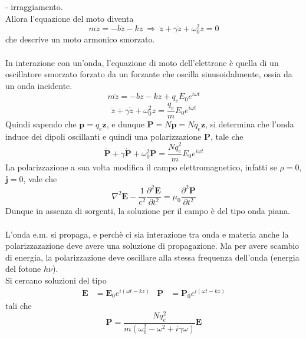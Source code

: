 \documentclass{article}
\begin{document}
- irraggiamento.\\
Allora l'equazione del moto diventa
\begin{equation}
    m\ddot{z}=-b\dot{z}-kz \ \Rightarrow \ \ddot{z}+\gamma\dot{z}+\omega_0^2z=0
\nonumber
\end{equation}
che descrive un moto armonico smorzato.\\
\\
In interazione con un’onda, l’equazione di moto dell’elettrone è quella di un oscillatore smorzato forzato da un forzante che oscilla sinusoidalmente, ossia da un onda incidente.
\begin{equation}
    m\ddot{z}=-b\dot{z}-kz+q_eE_0e^{i\omega t}
\nonumber
\end{equation}
\begin{equation}
    \ddot{z}+\gamma\dot{z}+\omega_0^2z=\frac{q_e}{m} E_0e^{i\omega t}
\nonumber
\end{equation}
Quindi sapendo che $\textbf{p}=q_e\textbf{z}$, e dunque $\textbf{P}=N\textbf{p}=Nq_e\textbf{z}$, si determina che l’onda induce dei dipoli oscillanti e quindi una polarizzazione \textbf{P}, tale che
\begin{equation}
    \ddot{\textbf{P}}+\gamma\dot{\textbf{P}}+\omega_0^2\textbf{P} =\frac{Nq_e^2}{m} E_0e^{i\omega t}
    \nonumber
\end{equation}
La polarizzazione a sua volta modifica il campo elettromagnetico, infatti se $\rho=0$, $\textbf{j}=0$, vale che 
\begin{equation}
    \nabla^2\textbf{E}-\frac{1}{c^2}\frac{\partial^2\textbf{E}}{\partial t^2}=\mu_0\frac{\partial^2\textbf{P}}{\partial t^2}
\end{equation}
Dunque in assenza di sorgenti, la soluzione per il campo è del tipo onda piana.\\
\\
L’onda e.m. si propaga, e perchè ci sia interazione tra onda e materia anche la polarizzazazione deve avere una soluzione di propagazione. Ma per avere scambio di energia, la polarizzazione deve oscillare alla stessa frequenza dell’onda (energia del fotone $h\nu$).\\
Si cercano soluzioni del tipo
\begin{align*}
    \textbf{E}&=\textbf{E}_0e^{i(\omega t-kz)} & \textbf{P}&=\textbf{P}_0e^{i(\omega t-kz)}
\nonumber
\end{align*}
tali che
\begin{equation}
    \textbf{P}=\frac{Nq_e^2}{m(\omega_0^2-\omega^2+i\gamma\omega)}\textbf{E}
\nonumber
\end{equation}
\end{document}
